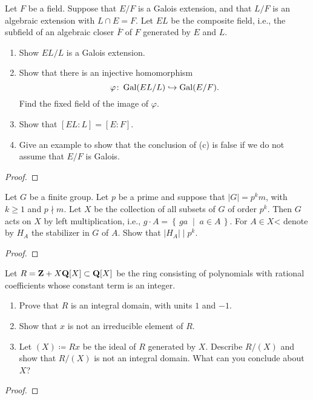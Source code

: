 \begin{problem}
Let $F$ be a field. Suppose that $E/F$ is a Galois extension, and that
$L/F$ is an algebraic extension with $L\cap E=F$. Let $EL$ be the composite
field, i.e., the subfield of an algebraic closer $\bar F$ of $F$ generated
by $E$ and $L$.
\begin{enumerate}[label=(\alph*)]
\item Show $EL/L$ is a Galois extension.
\item Show that there is an injective homomorphism
\[\varphi\colon\operatorname{Gal}(EL/L)\hookrightarrow\operatorname{Gal}(E/F).\]
Find the fixed field of the image of $\varphi$.
\item Show that $[EL:L]=[E:F]$.
\item Give an example to show that the conclusion of (c) is false if we do
  not assume that $E/F$ is Galois.
\end{enumerate}
\end{problem}
\begin{proof}
\end{proof}

\begin{problem}
Let $G$ be a finite group. Let $p$ be a prime and suppose that $|G|=p^km$,
with $k\geq 1$ and $p\nmid m$. Let $X$ be the collection of all subsets of
$G$ of order $p^k$. Then $G$ acts on $X$ by left multiplication, i.e.,
$g\cdot A=\left\{\,ga\;\middle|\;a\in A\,\right\}$. For $A\in X$< denote by
$H_A$ the stabilizer in $G$ of $A$. Show that $|H_A|\mid p^k$.
\end{problem}
\begin{proof}
\end{proof}

\begin{problem}
Let $R=\mathbf{Z}+X\mathbf{Q}[X]\subset\mathbf{Q}[X]$ be the ring consisting of polynomials
with rational coefficients whose constant term is an integer.
\begin{enumerate}[label=(\alph*)]
\item Prove that $R$ is an integral domain, with units $1$ and $-1$.
\item Show that $x$ is not an irreducible element of $R$.
\item Let $(X)\coloneqq Rx$ be the ideal of $R$ generated by $X$. Describe
  $R/(X)$ and show that $R/(X)$ is not an integral domain. What can you
  conclude about $X$?
\end{enumerate}
\end{problem}
\begin{proof}
\end{proof}

